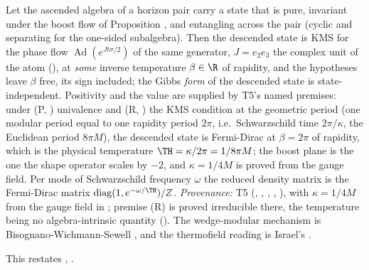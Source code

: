 Let the ascended algebra of a horizon pair carry a state that is pure, invariant under the boost flow of Proposition , and entangling across the pair (cyclic and separating for the one-sided subalgebra). Then the descended state is KMS for the phase flow $\operatorname{Ad}(e^{Jt\sigma/2})$ of the same generator, $J = e_{2}e_{3}$ the complex unit of the atom (), at \emph{some} inverse temperature $\beta \in \R$ of rapidity, and the hypotheses leave $\beta$ free, its sign included; the Gibbs \emph{form} of the descended state is state-independent. Positivity and the value are supplied by T5's named premises: under (P, ) univalence and (R, ) the KMS condition at the geometric period (one modular period equal to one rapidity period $2\pi$, i.e.\ Schwarzschild time $2\pi/\kappa$, the Euclidean period $8\pi M$), the descended state is Fermi-Dirac at $\beta = 2\pi$ of rapidity, which is the physical temperature $\TH = \kappa/2\pi = 1/8\pi M$; the boost plane is the one the shape operator scales by $-2$, and $\kappa = 1/4M$ is proved from the gauge field. Per mode of Schwarzschild frequency $\omega$ the reduced density matrix is the Fermi-Dirac matrix $\mathrm{diag}(1, e^{-\omega/\TH})/Z$. \emph{Provenance:} T5 \cite[Thms.~7.3 and 7.6, Prems.~7.8 and 7.19, Prop.~7.18, Thm.~7.20, Cor.~6.4]{ButlerT5} (, , , , ), with $\kappa = 1/4M$ from the gauge field in \cite[App.~A]{ButlerT5}; premise (R) is proved irreducible there, the temperature being no algebra-intrinsic quantity \cite[Thm.~7.16]{ButlerT5} (). The wedge-modular mechanism is Bisognano-Wichmann-Sewell \cite{BisognanoWichmann1976, Sewell1982}, and the thermofield reading is Israel's \cite{Israel1976}.

This restates , .
